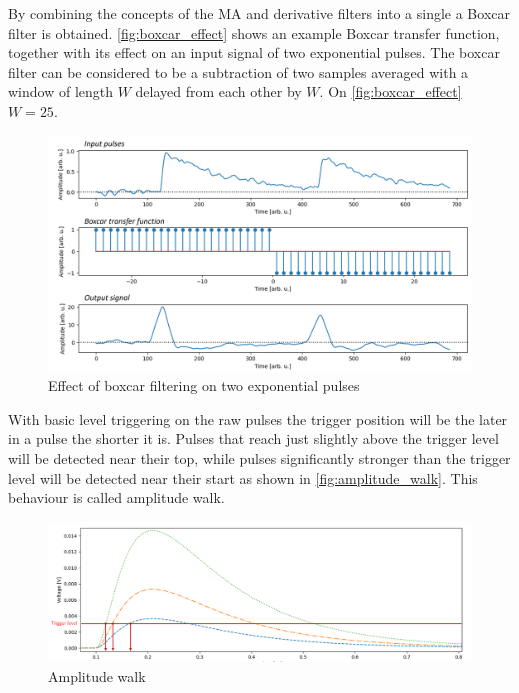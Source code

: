 By combining the concepts of the MA and derivative filters
into a single a Boxcar filter is obtained. 
\autoref{fig:boxcar_effect} shows an example Boxcar transfer function,
together with its effect on an input signal of two exponential pulses.
The boxcar filter can be considered
to be a subtraction of two samples averaged with a window
of length $W$ delayed from each other by $W$. 
On \autoref{fig:boxcar_effect} $W=25$.
\begin{figure}[H]
  \centering
  \includegraphics[width=\linewidth]{media/boxcar_effect.png}
  \caption{Effect of boxcar filtering on two exponential pulses}
  \label{fig:boxcar_effect} 
\end{figure}

With basic level triggering
on the raw pulses the trigger position will be the later in a pulse the 
shorter it is. Pulses that reach just slightly above the trigger level
will be detected near their top, while pulses significantly stronger
than the trigger level will be detected near their start as shown in 
\autoref{fig:amplitude_walk}. This behaviour is called amplitude walk.

\begin{figure}[H]
  \centering
  \includegraphics[width=\linewidth]{media/amplitude_walk.png}
  \caption{Amplitude walk}
  \label{fig:amplitude_walk} 
\end{figure}


